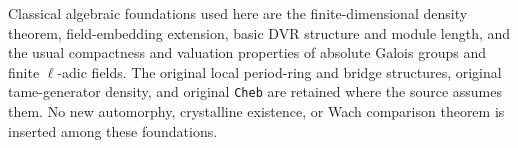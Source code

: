 \documentclass[11pt,a4paper]{article}
\numberwithin{equation}{section}
\theoremstyle{remark}\newtheorem{remark}[theorem]{Remark}
\begin{document}
Classical algebraic foundations used here are the
finite-dimensional density theorem, field-embedding extension,
basic DVR structure and module length, and the usual compactness
and valuation properties of absolute Galois groups and finite
$\ell$-adic fields. The original local period-ring and bridge
structures, original tame-generator density, and original
\texttt{Cheb} are retained where the source assumes them.
No new automorphy, crystalline existence, or Wach comparison
theorem is inserted among these foundations.

\endgroup
\end{document}
